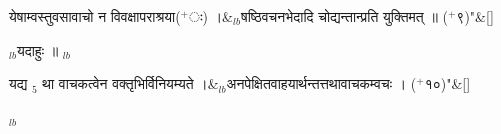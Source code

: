 \documentclass[article,12pt,a4paper]{memoir}%
\newcommand{\add}[1]{($^{+}$#1)}
\newcounter{parCount}
\begin{document}
	    
	    \stanza[\smallbreak]
	  येषाम्वस्तुवसावाचो न विवक्षापराश्रया\add{ः} ।&{\tiny $_{lb}$}\leavevmode{}षष्ठिवचनभेदादि चोद्यन्तान्प्रति युक्तिमत् ॥ \add{९}{\normalfontlatin\large\qquad{}"}\&[\smallbreak]
	  
	  
	  
	    \pstart  \leavevmode%
	    \hphantom{.}
	   {\tiny $_{lb}$}यदाहुः ॥
	{}
	\pend%
      {\tiny $_{lb}$}
	  \bigskip
	  \begingroup
	
	    
	    \stanza[\smallbreak]
	  यद्य {\tiny $_{5}$} था वाचकत्वेन वक्तृभिर्विनियम्यते ।&{\tiny $_{lb}$}अनपेक्षितवाहयार्थन्तत्तथावाचकम्वचः । \add{१०}{\normalfontlatin\large\qquad{}"}\&[\smallbreak]
	  
	  
	  
	  \endgroup
	{\tiny $_{lb}$}
\end{document}
